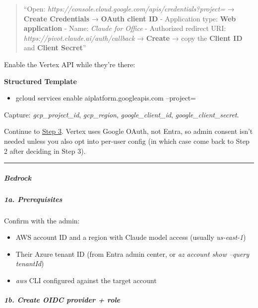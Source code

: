 \documentclass[11pt]{article}
\begin{document}
\begin{quote}
``Open: \emph{https://console.cloud.google.com/apis/credentials?project=} → \textbf{Create Credentials} → \textbf{OAuth client ID} - Application type: \textbf{Web application} - Name: \emph{Claude for Office} - Authorized redirect URI: \emph{https://pivot.claude.ai/auth/callback} → \textbf{Create} → copy the \textbf{Client ID} and \textbf{Client Secret}''
\end{quote}

Enable the Vertex API while they're there:


\textbf{Structured Template}
\begin{itemize}[leftmargin=*,itemsep=2pt,topsep=2pt]
\item {} gcloud services enable aiplatform.googleapis.com --project=
\end{itemize}

Capture: \emph{gcp\_\allowbreak{}project\_\allowbreak{}id}, \emph{gcp\_\allowbreak{}region}, \emph{google\_\allowbreak{}client\_\allowbreak{}id}, \emph{google\_\allowbreak{}client\_\allowbreak{}secret}.


Continue to \href{\#step-3--decide-whats-org-wide-vs-per-user}{Step 3}. Vertex uses Google OAuth, not Entra, so admin consent isn't needed unless you also opt into per-user config (in which case come back to Step 2 after deciding in Step 3).


\vspace{0.5em}\hrule\vspace{0.5em}

\subparagraph{Bedrock}\mbox{}\par

\subparagraph{1a. Prerequisites}\mbox{}\par

Confirm with the admin:

\begin{itemize}[leftmargin=*,itemsep=2pt,topsep=2pt]
\item {} AWS account ID and a region with Claude model access (usually \emph{us-east-1})
\item {} Their Azure tenant ID (from Entra admin center, or \emph{az account show --query tenantId})
\item {} \emph{aws} CLI configured against the target account
\end{itemize}

\subparagraph{1b. Create OIDC provider + role}\mbox{}\par
\end{document}
